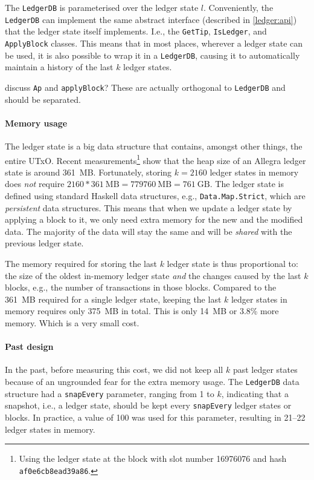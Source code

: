 The \lstinline!LedgerDB! is parameterised over the ledger state $l$.
Conveniently, the \lstinline!LedgerDB! can implement the same abstract interface
(described in \cref{ledger:api}) that the ledger state itself implements. I.e.,
the \lstinline!GetTip!, \lstinline!IsLedger!, and \lstinline!ApplyBlock!
classes. This means that in most places, wherever a ledger state can be used, it
is also possible to wrap it in a \lstinline!LedgerDB!, causing it to
automatically maintain a history of the last $k$ ledger states.

 discuss \lstinline!Ap! and \lstinline!applyBlock!? These are
actually orthogonal to \lstinline!LedgerDB! and should be separated.


\paragraph{Memory usage}

The ledger state is a big data structure that contains, amongst other things,
the entire UTxO. Recent measurements\footnote{Using the ledger state at the
block with slot number \num{16976076} and hash \lstinline!af0e6cb8ead39a86!.}
show that the heap size of an Allegra ledger state is around \num{361}~MB.
Fortunately, storing $k = \num{2160}$ ledger states in memory does \emph{not}
require $\num{2160} * \num{361}~\textrm{MB} = \num{779760}~\textrm{MB} =
\num{761}~\textrm{GB}$. The ledger state is defined using standard Haskell data
structures, e.g., \lstinline!Data.Map.Strict!, which are \emph{persistent} data
structures. This means that when we update a ledger state by applying a block to
it, we only need extra memory for the new and the modified data. The majority of
the data will stay the same and will be \emph{shared} with the previous ledger
state.

The memory required for storing the last $k$ ledger state is thus proportional
to: the size of the oldest in-memory ledger state \emph{and} the changes caused
by the last $k$ blocks, e.g., the number of transactions in those blocks.
Compared to the \num{361}~MB required for a single ledger state, keeping the
last $k$ ledger states in memory requires only \num{375}~MB in total. This is
only \num{14}~MB or 3.8\% more memory. Which is a very small cost.

\paragraph{Past design}

In the past, before measuring this cost, we did not keep all $k$ past ledger
states because of an ungrounded fear for the extra memory usage. The
\lstinline!LedgerDB! data structure had a \lstinline!snapEvery! parameter,
ranging from 1 to $k$, indicating that a snapshot, i.e., a ledger state, should
be kept every \lstinline!snapEvery! ledger states or blocks. In practice, a
value of 100 was used for this parameter, resulting in 21--22 ledger states in
memory.

